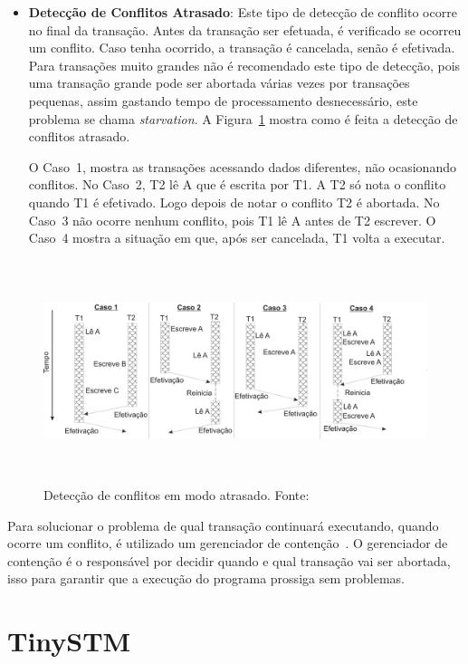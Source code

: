 \documentclass[diss,capa]{texufpel}
\begin{document}
\begin{itemize}
 \item \textbf{Detecção de Conflitos Atrasado}: Este tipo de detecção de conflito ocorre no final da transação.  Antes da transação ser efetuada, é verificado se ocorreu um conflito. Caso tenha ocorrido, a transação é cancelada, senão é efetivada. Para transações muito grandes não é recomendado este tipo de detecção, pois uma transação grande pode ser abortada várias vezes por transações pequenas, assim gastando tempo de processamento desnecessário, este problema se chama \emph{starvation}. A Figura~\ref{figuradeteccaoatrasado} mostra como é feita a detecção de conflitos atrasado.

 O Caso~1, mostra as transações acessando dados diferentes, não ocasionando conflitos. No Caso~2, T2 lê A que é escrita por T1. A T2 só nota o conflito quando T1 é efetivado. Logo depois de notar o conflito T2 é abortada. No Caso~3 não ocorre nenhum conflito, pois T1 lê A antes de T2 escrever. O Caso~4 mostra a situação em que, após ser cancelada, T1 volta a executar.
\end{itemize}

\begin{figure}[!htp]
\centering
\includegraphics[height=6.5cm]{images/conflitoatrasado.png}
\caption{Detecção de conflitos em modo atrasado. Fonte:~\cite{rigotm}}
\label{figuradeteccaoatrasado}
\end{figure}


Para solucionar o problema de qual transação continuará executando, quando ocorre um conflito, é utilizado um gerenciador de contenção~\cite{TM2010}. O gerenciador de contenção é o responsável por decidir quando e qual transação vai ser abortada, isso para garantir que a execução do programa prossiga sem problemas.

\section{TinySTM}
\end{document}
